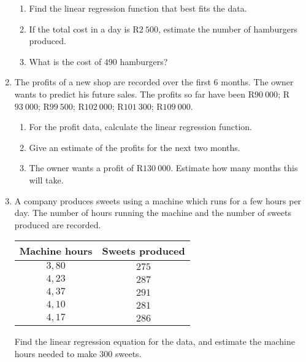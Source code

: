 \begin{eocexercises}{}
\begin{enumerate}
\begin{enumerate}
\item Find the linear regression function that best fits the data.

\item If the total cost in a day is R$2~500$, estimate the number of hamburgers produced.

\item What is the cost of $490$ hamburgers?

\end{enumerate}

\item
The profits of a new shop are recorded over the first 6 months. The owner wants to predict his future sales. The profits so far have been R$90~000$; R$93~000$; R$99~500$; R$102~000$; R$101~300$; R$109~000$. 

\begin{enumerate}
\item For the profit data, calculate the linear regression function.

\item Give an estimate of the profits for the next two months.

\item The owner wants a profit of R$130~000$. Estimate how many months this will take.
\end{enumerate}

\item
A company produces sweets using a machine which runs for a few hours per day. The number of hours running the machine and the number of sweets produced are recorded.

\begin{tabular}{|c|c|}
\hline
Machine hours & Sweets produced\\
\hline
$3,80$ & $275$ \\ \hline
$4,23$ & $287$ \\ \hline
$4,37$ & $291$ \\ \hline
$4,10$ & $281$ \\ \hline
$4,17$ & $286$ \\ 
\hline

\hline
\end{tabular}

Find the linear regression equation for the data, and estimate the machine hours needed to make $300$ sweets.


\end{enumerate}





\end{eocexercises}
